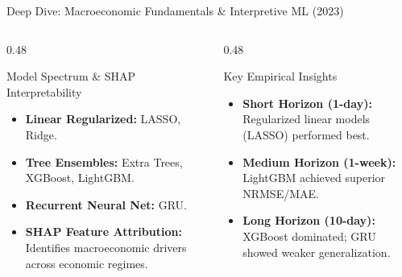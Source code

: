 \documentclass[aspectratio=169]{beamer}
\begin{document}
\begin{frame}{Deep Dive: Macroeconomic Fundamentals \& Interpretive ML (2023)}

	\begin{columns}[T]
		\begin{column}{0.48\textwidth}
			\begin{block}{Model Spectrum \& SHAP Interpretability}
				\begin{itemize}
					\item \textbf{Linear Regularized:} LASSO, Ridge.
					\item \textbf{Tree Ensembles:} Extra Trees, XGBoost, LightGBM.
					\item \textbf{Recurrent Neural Net:} GRU.
					\item \textbf{SHAP Feature Attribution:} Identifies macroeconomic drivers across economic regimes.
				\end{itemize}
			\end{block}
		\end{column}
		\begin{column}{0.48\textwidth}
			\begin{block}{Key Empirical Insights}
				\begin{itemize}
					\item \textbf{Short Horizon (1-day):} Regularized linear models (LASSO) performed best.
					\item \textbf{Medium Horizon (1-week):} LightGBM achieved superior NRMSE/MAE.
					\item \textbf{Long Horizon (10-day):} XGBoost dominated; GRU showed weaker generalization.
				\end{itemize}
			\end{block}
		\end{column}
	\end{columns}
\end{frame}
\end{document}

